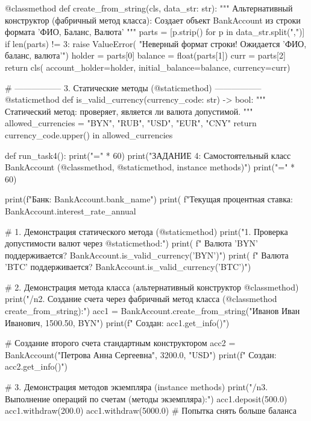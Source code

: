 \documentclass[14pt,a4paper]{extarticle}
\begin{document}
\begin{CodeListing}
    @classmethod
    def create_from_string(cls, data_str: str):
        """
        Альтернативный конструктор (фабричный метод класса):
        Создает объект BankAccount из строки формата 'ФИО, Баланс, Валюта'
        """
        parts = [p.strip() for p in data_str.split(",")]
        if len(parts) != 3:
            raise ValueError(
                "Неверный формат строки! Ожидается 'ФИО, баланс, валюта'")
        holder = parts[0]
        balance = float(parts[1])
        curr = parts[2]
        return cls(
            account_holder=holder,
            initial_balance=balance,
            currency=curr)

    # ----------------- 3. Статические методы (@staticmethod) -----------------
    @staticmethod
    def is_valid_currency(currency_code: str) -> bool:
        """
        Статический метод: проверяет, является ли валюта допустимой.
        """
        allowed_currencies = {"BYN", "RUB", "USD", "EUR", "CNY"}
        return currency_code.upper() in allowed_currencies



def run_task4():
    print("=" * 60)
    print("ЗАДАНИЕ 4: Самостоятельный класс BankAccount (@classmethod, @staticmethod, instance methods)")
    print("=" * 60)

    print(f"Банк: {BankAccount.bank_name}")
    print(
        f"Текущая процентная ставка: {
            BankAccount.interest_rate_annual}%

    # 1. Демонстрация статического метода (@staticmethod)
    print("1. Проверка допустимости валют через @staticmethod:")
    print(
        f"  Валюта 'BYN' поддерживается? {
            BankAccount.is_valid_currency('BYN')}")
    print(
        f"  Валюта 'BTC' поддерживается? {
            BankAccount.is_valid_currency('BTC')}")

    # 2. Демонстрация метода класса (альтернативный конструктор @classmethod)
    print("/n2. Создание счета через фабричный метод класса (@classmethod create_from_string):")
    acc1 = BankAccount.create_from_string("Иванов Иван Иванович, 1500.50, BYN")
    print(f"  Создан: {acc1.get_info()}")

    # Создание второго счета стандартным конструктором
    acc2 = BankAccount("Петрова Анна Сергеевна", 3200.0, "USD")
    print(f"  Создан: {acc2.get_info()}")

    # 3. Демонстрация методов экземпляра (instance methods)
    print("/n3. Выполнение операций по счетам (методы экземпляра):")
    acc1.deposit(500.0)
    acc1.withdraw(200.0)
    acc1.withdraw(5000.0)  # Попытка снять больше баланса


\end{CodeListing}
\end{document}
